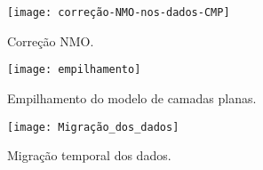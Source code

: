 \begin{figure}[ht!]
	\centering
	\texttt{[image: correção-NMO-nos-dados-CMP]}
	\caption{Correção NMO.} \label{fig:correcao}
\end{figure}

\begin{figure}[ht!]
	\centering
	\texttt{[image: empilhamento]}
	\caption{Empilhamento do modelo de camadas planas.} \label{fig:empilhamento}
\end{figure}

\begin{figure}[ht!]
	\centering
	\texttt{[image: Migração\_dos\_dados]}
	\caption{Migração temporal dos dados.} \label{fig:mig}
\end{figure}